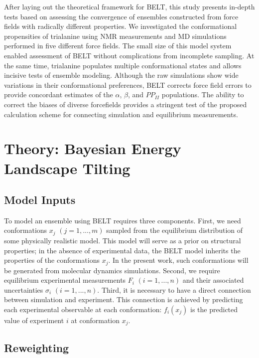\documentclass[12pt]{article}
\begin{document}
After laying out the theoretical framework for BELT, this study presents in-depth tests based on assessing the convergence of ensembles constructed from force fields with radically different properties.  We investigated the conformational propensities of trialanine using NMR measurements \cite{Graf2007} and MD simulations performed in five different force fields.  The small size of this model system enabled assessment of BELT without complications from incomplete sampling.  At the same time, trialanine populates multiple conformational states and allows incisive tests of ensemble modeling.  Although the raw simulations show wide variations in their conformational preferences, BELT corrects force field errors to provide concordant estimates of the $\alpha$, $\beta$, and $PP_{II}$ populations.  The ability to correct the biases of diverse forcefields provides a stringent test of the proposed calculation scheme for connecting simulation and equilibrium measurements. 


\section*{Theory: Bayesian Energy Landscape Tilting}

\subsection*{Model Inputs}

To model an ensemble using BELT requires three components.  First, we need conformations $x_j$  $(j = 1 , ... , m)$ sampled from the equilibrium distribution of some physically realistic model.  This model will serve as a prior on structural properties; in the absence of experimental data, the BELT model inherits the properties of the conformations $x_j$.  In the present work, such conformations will be generated from molecular dynamics simulations.  Second, we require equilibrium experimental measurements $F_i$ $(i = 1 , ... , n)$ and their associated uncertainties $\sigma_i$ $(i = 1 , ... , n)$.  Third, it is necessary to have a direct connection between simulation and experiment.  This connection is achieved by predicting each experimental observable at each conformation: $f_i(x_j)$ is the predicted value of experiment $i$ at conformation $x_j$.  

\subsection*{Reweighting}
\end{document}
